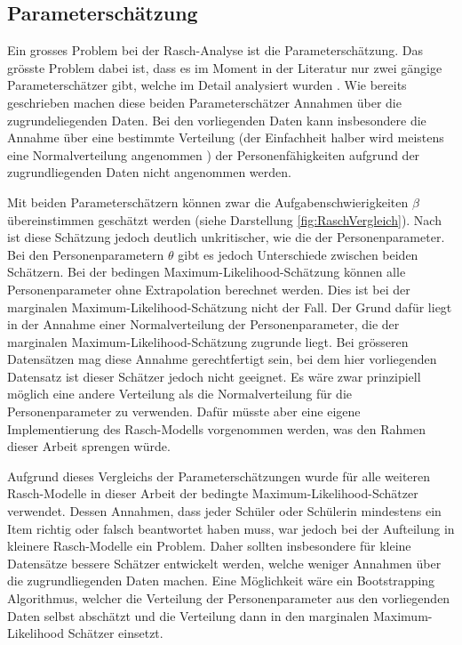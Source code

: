 \subsection{Parameterschätzung}

Ein grosses Problem bei der Rasch-Analyse ist die Parameterschätzung. Das grösste Problem dabei ist, dass es im Moment in der Literatur nur zwei gängige Parameterschätzer gibt, welche im Detail analysiert wurden \citep{Fischer1995,Rost2004, Strobl2012}. Wie bereits geschrieben machen diese beiden Parameterschätzer Annahmen über die zugrundeliegenden Daten. Bei den vorliegenden Daten kann insbesondere die Annahme über eine bestimmte Verteilung (der Einfachheit halber wird meistens eine Normalverteilung angenommen \citep{Rost2004}) der Personenfähigkeiten aufgrund der zugrundliegenden Daten nicht angenommen werden.

Mit beiden Parameterschätzern können zwar die Aufgabenschwierigkeiten $\beta$ übereinstimmen geschätzt werden (siehe Darstellung \ref{fig:RaschVergleich}). Nach \citet{Rost2004} ist diese Schätzung jedoch deutlich unkritischer, wie die der Personenparameter. Bei den Personenparametern $\theta$ gibt es jedoch Unterschiede zwischen beiden Schätzern. Bei der bedingen Maximum-Likelihood-Schätzung können alle Personenparameter ohne Extrapolation berechnet werden. Dies ist bei der marginalen Maximum-Likelihood-Schätzung nicht der Fall. Der Grund dafür liegt in der Annahme einer Normalverteilung der Personenparameter, die der marginalen Maximum-Likelihood-Schätzung zugrunde liegt. Bei grösseren Datensätzen mag diese Annahme gerechtfertigt sein, bei dem hier vorliegenden Datensatz ist dieser Schätzer jedoch nicht geeignet. Es wäre zwar prinzipiell möglich eine andere Verteilung als die Normalverteilung für die Personenparameter zu verwenden. Dafür müsste aber eine eigene Implementierung des Rasch-Modells vorgenommen werden, was den Rahmen dieser Arbeit sprengen würde.

Aufgrund dieses Vergleichs der Parameterschätzungen wurde für alle weiteren Rasch-Modelle in dieser Arbeit der bedingte Maximum-Likelihood-Schätzer verwendet. Dessen Annahmen, dass jeder Schüler oder Schülerin mindestens ein Item richtig oder falsch beantwortet haben muss, war jedoch bei der Aufteilung in kleinere Rasch-Modelle ein Problem. Daher sollten insbesondere für kleine Datensätze bessere Schätzer entwickelt werden, welche weniger Annahmen über die zugrundliegenden Daten machen. Eine Möglichkeit wäre ein Bootstrapping Algorithmus, welcher die Verteilung der Personenparameter aus den vorliegenden Daten selbst abschätzt und die Verteilung dann in den marginalen Maximum-Likelihood Schätzer einsetzt.

